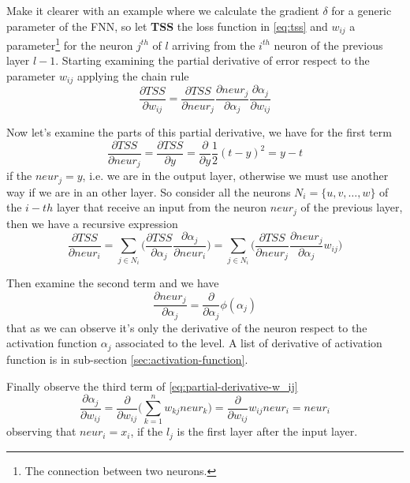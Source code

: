 Make it clearer with an example where we calculate the gradient $\delta$ for a generic parameter of the FNN, so let \textbf{TSS} the loss function in \ref{eq:tss} and $w_{ij}$ a parameter\footnote{The connection between two neurons.} for the neuron $j^{th}$ of $l$ arriving from the $i^{th}$ neuron of the previous layer $l-1$. Starting examining the partial derivative of error respect to the parameter $w_{ij}$ applying the chain rule
\begin{equation}
	\frac{\partial{TSS}}{\partial{w_{ij}}} = \frac{\partial{TSS}}{\partial{neur_j}}\frac{\partial{neur_j}}{\partial{\alpha_j}}\frac{\partial{\alpha_j}}{\partial{w_{ij}}}
\end{equation}\label{eq:partial-derivative-w_ij}

Now let's examine the parts of this partial derivative, we have for the first term
\begin{equation}
	\frac{\partial{TSS}}{\partial{neur_j}} = \frac{\partial{TSS}}{\partial{y}} = \frac{\partial{}}{\partial{y}}\frac{1}{2}(t - y)^2 = y - t
\end{equation}\label{eq:partial-derivative-output-layer}
if the $neur_j = y$, i.e. we are in the output layer, otherwise we must use another way if we are in an other layer. So consider all the neurons $N_i = \{u, v, \dots, w\}$ of the $i-th$ layer that receive an input from the neuron $neur_j$ of the previous layer, then we have a recursive expression
\begin{equation}
	\frac{\partial{TSS}}{\partial{neur_i}} = \sum\limits_{j \in N_i}\Bigg(\frac{\partial{TSS}}{\partial\alpha_j}\frac{\partial{\alpha_j}}{\partial{neur_i}}\Bigg) = \sum\limits_{j \in N_i}\Bigg(\frac{\partial{TSS}}{\partial{neur_j}}\frac{\partial{neur_j}}{\partial{\alpha_j}}w_{ij}\Bigg)
\end{equation}\label{eq:partial-derivative-inner-layer}

Then examine the second term and we have
\begin{equation}
	\frac{\partial{neur_j}}{\partial{\alpha_j}} = \frac{\partial{}}{\partial{\alpha_j}}\phi(\alpha_j)
\end{equation}
that as we can observe it's only the derivative of the neuron respect to the activation function $\alpha_j$ associated to the level. A list of derivative of activation function is in sub-section \ref{sec:activation-function}.

Finally observe the third term of \ref{eq:partial-derivative-w_ij}
\begin{equation}
	\frac{\partial{\alpha_j}}{\partial{w_{ij}}} = \frac{\partial{}}{\partial{w_{ij}}}\Bigg(\sum\limits_{k=1}^n w_{kj}neur_k\Bigg) = \frac{\partial{}}{\partial{w_{ij}}}w_{ij}neur_i = neur_i
\end{equation}
observing that $neur_i = x_i$, if the $l_j$ is the first layer after the input layer.

